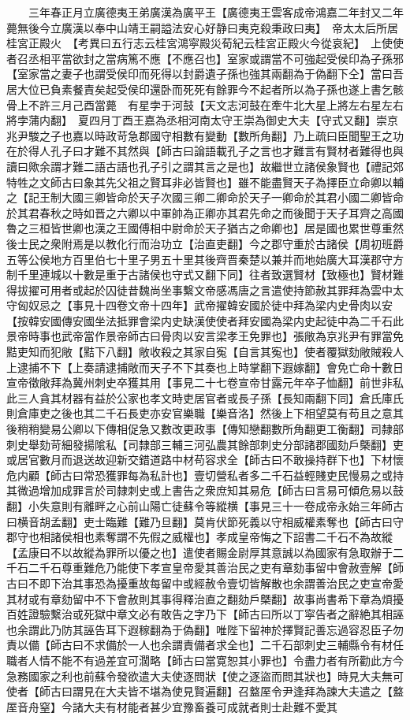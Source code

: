 　　三年春正月立廣德夷王弟廣漢為廣平王【廣德夷王雲客成帝鴻嘉二年封又二年薨無後今立廣漢以奉中山靖王嗣謚法安心好静曰夷克殺秉政曰夷】　帝太太后所居桂宮正殿火　【考異曰五行志云桂宮鴻寜殿災荀紀云桂宮正殿火今從哀紀】　上使使者召丞相平當欲封之當病篤不應【不應召也】室家或謂當不可強起受侯印為子孫邪【室家當之妻子也謂受侯印而死得以封爵遺子孫也強其兩翻為于偽翻下仝】當曰吾居大位已負素餐責矣起受侯印還卧而死死有餘罪今不起者所以為子孫也遂上書乞骸骨上不許三月己酉當薨　有星孛于河鼓【天文志河鼓在牽牛北大星上將左右星左右將孛蒲内翻】　夏四月丁酉王嘉為丞相河南太守王崇為御史大夫【守式又翻】崇京兆尹駿之子也嘉以時政苛急郡國守相數有變動【數所角翻】乃上疏曰臣聞聖王之功在於得人孔子曰才難不其然與【師古曰論語載孔子之言也才難言有賢材者難得也與讀曰歟余謂才難二語古語也孔子引之謂其言之是也】故繼世立諸侯象賢也【禮記郊特牲之文師古曰象其先父祖之賢耳非必皆賢也】雖不能盡賢天子為擇臣立命卿以輔之【記王制大國三卿皆命於天子次國三卿二卿命於天子一卿命於其君小國二卿皆命於其君春秋之時如晋之六卿以中軍帥為正卿亦其君先命之而後聞于天子耳齊之高國魯之三桓皆世卿也漢之王國傅相中尉命於天子猶古之命卿也】居是國也累世尊重然後士民之衆附焉是以教化行而治功立【治直吏翻】今之郡守重於古諸侯【周初班爵五等公侯地方百里伯七十里子男五十里其後齊晋秦楚以兼并而地始廣大耳漢郡守方制千里連城以十數是重于古諸侯也守式又翻下同】往者致選賢材【致極也】賢材難得拔擢可用者或起於囚徒昔魏尚坐事繫文帝感馮唐之言遣使持節赦其罪拜為雲中太守匈奴忌之【事見十四卷文帝十四年】武帝擢韓安國於徒中拜為梁内史骨肉以安【按韓安國傳安國坐法抵罪會梁内史缺漢使使者拜安國為梁内史起徒中為二千石此景帝時事也武帝當作景帝師古曰骨肉以安言梁孝王免罪也】張敞為京兆尹有罪當免黠吏知而犯敞【黠下八翻】敞收殺之其家自寃【自言其寃也】使者覆獄劾敞賊殺人上逮捕不下【上奏請逮捕敞而天子不下其奏也上時掌翻下遐嫁翻】會免亡命十數日宣帝徵敞拜為冀州刺史卒獲其用【事見二十七卷宣帝甘露元年卒子恤翻】前世非私此三人貪其材器有益於公家也孝文時吏居官者或長子孫【長知兩翻下同】倉氏庫氏則倉庫吏之後也其二千石長吏亦安官樂職【樂音洛】然後上下相望莫有苟且之意其後稍稍變易公卿以下傳相促急又數改更政事【傳知戀翻數所角翻更工衡翻】司隸部刺史舉劾苛細發揚隂私【司隸部三輔三河弘農其餘部刺史分部諸郡國劾戶槩翻】吏或居官數月而退送故迎新交錯道路中材苟容求全【師古曰不敢操持群下也】下材懷危内顧【師古曰常恐獲罪每為私計也】壹切營私者多二千石益輕賤吏民慢易之或持其微過增加成罪言於司隸刺史或上書告之衆庶知其易危【師古曰言易可傾危易以鼓翻】小失意則有離畔之心前山陽亡徒蘇令等縱横【事見三十一卷成帝永始三年師古曰横音胡孟翻】吏士臨難【難乃旦翻】莫肯伏節死義以守相威權素奪也【師古曰守郡守也相諸侯相也素奪謂不先假之威權也】孝成皇帝悔之下詔書二千石不為故縱【孟康曰不以故縱為罪所以優之也】遣使者賜金尉厚其意誠以為國家有急取辦于二千石二千石尊重難危乃能使下孝宣皇帝愛其善治民之吏有章劾事留中會赦壹解【師古曰不即下治其事恐為擾重故每留中或經赦令壹切皆解散也余謂善治民之吏宣帝愛其材或有章劾留中不下會赦則其事得釋治直之翻劾戶槩翻】故事尚書希下章為煩擾百姓證驗繫治或死獄中章文必有敢告之字乃下【師古曰所以丁寜告者之辭絶其相誣也余謂此乃防其誣告耳下遐稼翻為于偽翻】唯陛下留神於擇賢記善忘過容忍臣子勿責以備【師古曰不求備於一人也余謂責備者求全也】二千石部刺史三輔縣令有材任職者人情不能不有過差宜可濶略【師古曰當寛恕其小罪也】令盡力者有所勸此方今急務國家之利也前蘇令發欲遣大夫使逐問狀【使之逐盜而問其狀也】時見大夫無可使者【師古曰謂見在大夫皆不堪為使見賢遍翻】召盩厔令尹逢拜為諫大夫遣之【盩厔音舟窒】今諸大夫有材能者甚少宜豫畜養可成就者則士赴難不愛其